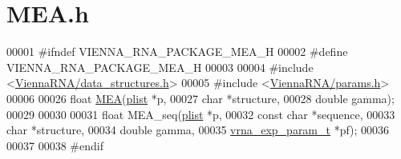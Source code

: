\hypertarget{MEA_8h_source}{}\section{M\+E\+A.\+h}
\label{MEA_8h_source}

\begin{DoxyCode}
00001 \textcolor{preprocessor}{#ifndef VIENNA\_RNA\_PACKAGE\_MEA\_H}
00002 \textcolor{preprocessor}{#define VIENNA\_RNA\_PACKAGE\_MEA\_H}
00003 
00004 \textcolor{preprocessor}{#include <\hyperlink{data__structures_8h}{ViennaRNA/data\_structures.h}>}
00005 \textcolor{preprocessor}{#include <\hyperlink{params_8h}{ViennaRNA/params.h}>}
00006 
00026 \textcolor{keywordtype}{float} \hyperlink{group__mea__fold_ga396ec6144c6a74fcbab4cea6b42d76c3}{MEA}(\hyperlink{group__struct__utils_structvrna__elem__prob__s}{plist}   *p,
00027           \textcolor{keywordtype}{char}    *structure,
00028           \textcolor{keywordtype}{double}  gamma);
00029 
00030 
00031 \textcolor{keywordtype}{float} MEA\_seq(\hyperlink{group__struct__utils_structvrna__elem__prob__s}{plist}             *p,
00032               \textcolor{keyword}{const} \textcolor{keywordtype}{char}        *sequence,
00033               \textcolor{keywordtype}{char}              *structure,
00034               \textcolor{keywordtype}{double}            gamma,
00035               \hyperlink{group__energy__parameters_structvrna__exp__param__s}{vrna\_exp\_param\_t}  *pf);
00036 
00037 
00038 \textcolor{preprocessor}{#endif}
\end{DoxyCode}
